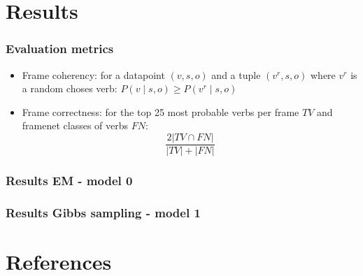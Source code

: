 \documentclass{beamer}
\begin{document}
\section{Results}
\begin{frame}
  \frametitle{Evaluation metrics}
  \begin{itemize}
  \item Frame coherency: for a datapoint $(v,s,o)$ and a tuple $(v^r,s,o)$ where $v^r$ is a random choses verb: $P(v\mid s,o) \geq P(v^r\mid s,o)$  
  \item Frame correctness: for the top 25 most probable verbs per frame $TV$ and framenet classes of verbs $FN$: \[\frac{2|TV\cap FN|}{|TV|+|FN|}\]
  \end{itemize}
\end{frame}

\begin{frame}
  \frametitle{Results EM - model 0}
\end{frame}

\begin{frame}
  \frametitle{Results Gibbs sampling - model 1}
\end{frame}

\section{References}
\begin{frame}[t,allowframebreaks]
\nocite{*}

\end{frame}
\end{document}
